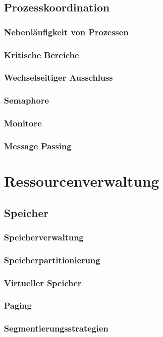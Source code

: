 \documentclass{article}
\begin{document}
\subsection{Prozesskoordination}
\subsubsection{Nebenläufigkeit von Prozessen}
\subsubsection{Kritische Bereiche}
\subsubsection{Wechselseitiger Ausschluss}
\subsubsection{Semaphore}
\subsubsection{Monitore}
\subsubsection{Message Passing}

\newpage
\section{Ressourcenverwaltung}
\subsection{Speicher}
\subsubsection{Speicherverwaltung}
\subsubsection{Speicherpartitionierung}
\subsubsection{Virtueller Speicher}
\subsubsection{Paging}
\subsubsection{Segmentierungsstrategien}
\end{document}

